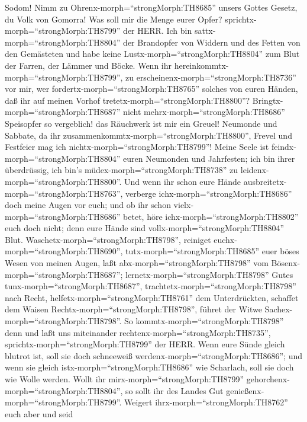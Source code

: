 Sodom! Nimm zu Ohrenx-morph=``strongMorph:TH8685'' unsers Gottes Gesetz,
du Volk von Gomorra!  Was soll mir die Menge eurer Opfer?
sprichtx-morph=``strongMorph:TH8799'' der HERR. Ich bin
sattx-morph=``strongMorph:TH8804'' der Brandopfer von Widdern und des
Fetten von den Gemästeten und habe keine
Lustx-morph=``strongMorph:TH8804'' zum Blut der Farren, der Lämmer und
Böcke.  Wenn ihr hereinkommtx-morph=``strongMorph:TH8799'',
zu erscheinenx-morph=``strongMorph:TH8736'' vor mir, wer
fordertx-morph=``strongMorph:TH8765'' solches von euren Händen, daß ihr
auf meinen Vorhof tretetx-morph=``strongMorph:TH8800''? 
Bringtx-morph=``strongMorph:TH8687'' nicht
mehrx-morph=``strongMorph:TH8686'' Speisopfer so vergeblich! das
Räuchwerk ist mir ein Greuel! Neumonde und Sabbate, da ihr
zusammenkommtx-morph=``strongMorph:TH8800'', Frevel und Festfeier mag
ich nichtx-morph=``strongMorph:TH8799''!  Meine Seele ist
feindx-morph=``strongMorph:TH8804'' euren Neumonden und Jahrfesten; ich
bin ihrer überdrüssig, ich bin's müdex-morph=``strongMorph:TH8738'' zu
leidenx-morph=``strongMorph:TH8800''.  Und wenn ihr schon
eure Hände ausbreitetx-morph=``strongMorph:TH8763'', verberge
ichx-morph=``strongMorph:TH8686'' doch meine Augen vor euch; und ob ihr
schon vielx-morph=``strongMorph:TH8686'' betet, höre
ichx-morph=``strongMorph:TH8802'' euch doch nicht; denn eure Hände sind
vollx-morph=``strongMorph:TH8804'' Blut. 
Waschetx-morph=``strongMorph:TH8798'', reiniget
euchx-morph=``strongMorph:TH8690'', tutx-morph=``strongMorph:TH8685''
euer böses Wesen von meinen Augen, laßt abx-morph=``strongMorph:TH8798''
vom Bösenx-morph=``strongMorph:TH8687''; 
lernetx-morph=``strongMorph:TH8798'' Gutes
tunx-morph=``strongMorph:TH8687'',
trachtetx-morph=``strongMorph:TH8798'' nach Recht,
helfetx-morph=``strongMorph:TH8761'' dem Unterdrückten, schaffet dem
Waisen Rechtx-morph=``strongMorph:TH8798'', führet der Witwe
Sachex-morph=``strongMorph:TH8798''.  So
kommtx-morph=``strongMorph:TH8798'' denn und laßt uns miteinander
rechtenx-morph=``strongMorph:TH8735'',
sprichtx-morph=``strongMorph:TH8799'' der HERR. Wenn eure Sünde gleich
blutrot ist, soll sie doch schneeweiß
werdenx-morph=``strongMorph:TH8686''; und wenn sie gleich
istx-morph=``strongMorph:TH8686'' wie Scharlach, soll sie doch wie Wolle
werden.  Wollt ihr mirx-morph=``strongMorph:TH8799''
gehorchenx-morph=``strongMorph:TH8804'', so sollt ihr des Landes Gut
genießenx-morph=``strongMorph:TH8799''.  Weigert
ihrx-morph=``strongMorph:TH8762'' euch aber und seid

